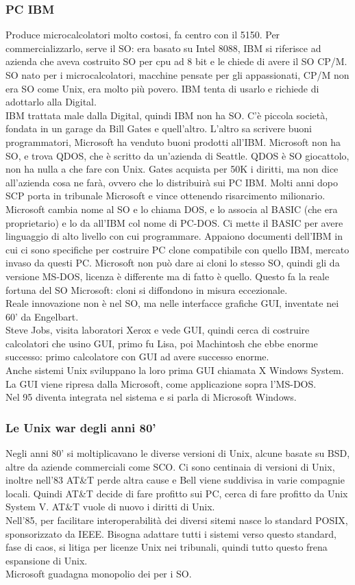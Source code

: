 \documentclass[12pt, oneside]{extbook}
\begin{document}
\subsubsection{PC IBM}
Produce microcalcolatori molto costosi, fa centro con il 5150. Per commercializzarlo, serve il SO: era basato su Intel 8088, IBM si riferisce ad azienda che aveva costruito SO per cpu ad 8 bit e le chiede di avere il SO CP/M. SO nato per i microcalcolatori, macchine pensate per gli appassionati, CP/M non era SO come Unix, era molto più povero. IBM tenta di usarlo e richiede di adottarlo alla Digital.\\ IBM trattata male dalla Digital, quindi IBM non ha SO. C'è piccola società, fondata in un garage da Bill Gates e quell'altro. L'altro sa scrivere buoni programmatori, Microsoft ha venduto buoni prodotti all'IBM. Microsoft non ha SO, e trova QDOS, che è scritto da un'azienda di Seattle. QDOS è SO giocattolo, non ha nulla a che fare con Unix. Gates acquista per 50K i diritti, ma non dice all'azienda cosa ne farà, ovvero che lo distribuirà sui PC IBM. Molti anni dopo SCP porta in tribunale Microsoft e vince ottenendo risarcimento milionario. Microsoft cambia nome al SO e lo chiama DOS, e lo associa al BASIC (che era proprietario) e lo da all'IBM col nome di PC-DOS. Ci mette il BASIC per avere linguaggio di alto livello con cui programmare. Appaiono documenti dell'IBM in cui ci sono specifiche per costruire PC clone compatibile con quello IBM, mercato invaso da questi PC. Microsoft non può dare ai cloni lo stesso SO, quindi gli da versione MS-DOS, licenza è differente ma di fatto è quello. Questo fa la reale fortuna del SO Microsoft: cloni si diffondono in misura eccezionale.\\ Reale innovazione non è nel SO, ma nelle interfacce grafiche GUI, inventate nei 60' da Engelbart.\\ Steve Jobs, visita laboratori Xerox e vede GUI, quindi cerca di costruire calcolatori che usino GUI, primo fu Lisa, poi Machintosh che ebbe enorme successo: primo calcolatore con GUI ad avere successo enorme.\\ Anche sistemi Unix sviluppano la loro prima GUI chiamata X Windows System. La GUI viene ripresa dalla Microsoft, come applicazione sopra l'MS-DOS.\\ Nel 95 diventa integrata nel sistema e si parla di Microsoft Windows.
\subsubsection{Le Unix war degli anni 80'}
Negli anni 80' si moltiplicavano le diverse versioni di Unix, alcune basate su BSD, altre da aziende commerciali come SCO. Ci sono centinaia di versioni di Unix, inoltre nell'83 AT\&T perde altra cause e Bell viene suddivisa in varie compagnie locali. Quindi AT\&T decide di fare profitto sui PC, cerca di fare profitto da Unix System V. AT\&T vuole di nuovo i diritti di Unix.\\ Nell'85, per facilitare interoperabilità dei diversi sitemi nasce lo standard POSIX, sponsorizzato da IEEE. Bisogna adattare tutti i sistemi verso questo standard, fase di caos, si litiga per licenze Unix nei tribunali, quindi tutto questo frena espansione di Unix.\\ Microsoft guadagna monopolio dei per i SO.
\end{document}
